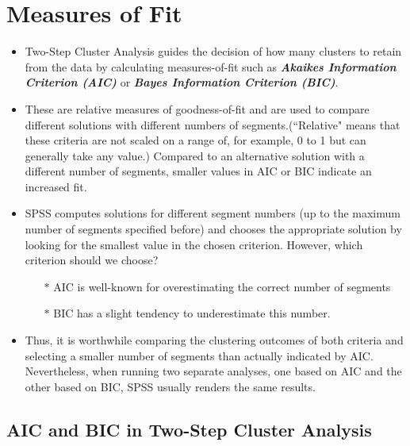 \documentclass[a4paper,12pt]{article}
\begin{document}
\section{Measures of Fit}
\begin{itemize}
	\item Two-Step Cluster Analysis guides the decision of how many clusters to retain from the data by
	calculating measures-of-fit such as \textbf{\textit{Akaikes Information Criterion (AIC)}} or \textbf{\textit{Bayes Information Criterion (BIC)}}.
	
	\item These are relative measures of goodness-of-fit and are used to compare different
	solutions with different numbers of segments.(``Relative" means that these criteria
	are not scaled on a range of, for example, 0 to 1 but can generally take any value.)
	Compared to an alternative solution with a different number of segments, smaller
	values in AIC or BIC indicate an increased fit.
	
\item SPSS computes solutions for different segment numbers (up to the maximum number of segments specified before) and
chooses the appropriate solution by looking for the smallest value in the chosen
criterion. However, which criterion should we choose?
\begin{itemize}
	\item[$\ast$] AIC is well-known for
	overestimating the correct number of segments
	\item[$\ast$] BIC has a slight tendency
	to underestimate this number.
\end{itemize}

	
	\item Thus, it is worthwhile comparing the clustering
	outcomes of both criteria and selecting a smaller number of segments than
	actually indicated by AIC. Nevertheless, when running two separate analyses,
	one based on AIC and the other based on BIC, SPSS usually renders the same
	results. 
\end{itemize}





\subsection{AIC and BIC in Two-Step Cluster Analysis}
\end{document}
